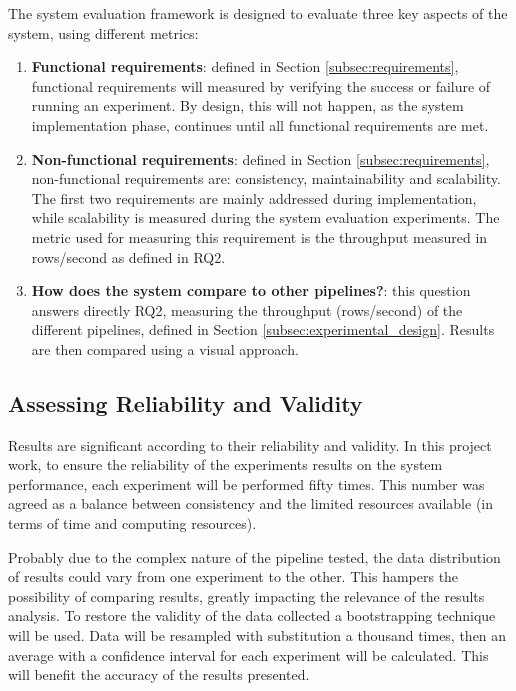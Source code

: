 The system evaluation framework is designed to evaluate three key aspects of the system, using different metrics:
\begin{enumerate}
    \item \textbf{Functional requirements}: defined in Section \ref{subsec:requirements}, functional requirements will measured by verifying the success or failure of running an experiment. By design, this will not happen, as the system implementation phase, continues until all functional requirements are met.
    \item \textbf{Non-functional requirements}: defined in Section \ref{subsec:requirements}, non-functional requirements are: consistency, maintainability and scalability. The first two requirements are mainly addressed during implementation, while scalability is measured during the system evaluation experiments. The metric used for measuring this requirement is the throughput measured in rows/second as defined in RQ2.
    \item \textbf{How does the system compare to other pipelines?}: this question answers directly RQ2, measuring the throughput (rows/second) of the different pipelines, defined in Section \ref{subsec:experimental_design}. Results are then compared using a visual approach.
\end{enumerate} 

\subsection{Assessing Reliability and Validity}

Results are significant according to their reliability and validity. In this project work, to ensure the reliability of the experiments results on the system performance, each experiment will be performed fifty times. This number was agreed as a balance between consistency and the limited resources available (in terms of time and computing resources).

Probably due to the complex nature of the pipeline tested, the data distribution of results could vary from one experiment to the other. This hampers the possibility of comparing results, greatly impacting the relevance of the results analysis. To restore the validity of the data collected a bootstrapping technique will be used. Data will be resampled with substitution a thousand times, then an average with a confidence interval for each experiment will be calculated. This will benefit the accuracy of the results presented.